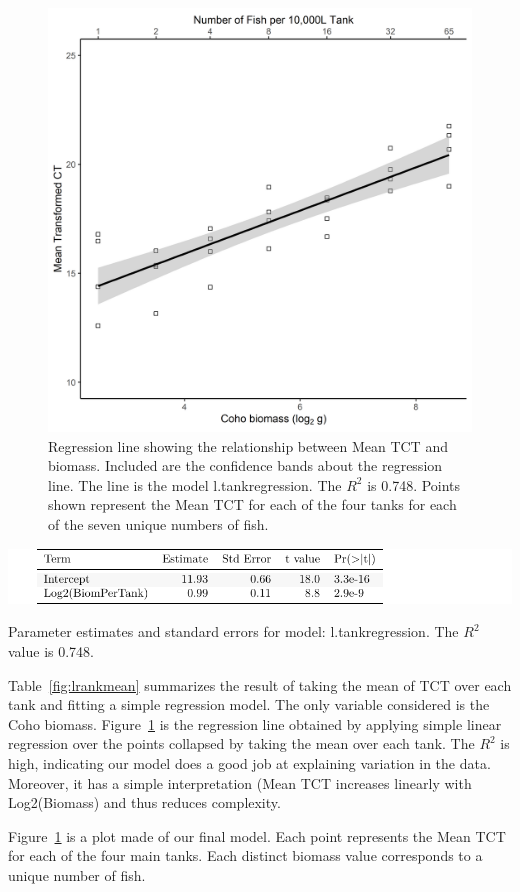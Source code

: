  
\begin{figure}[H]
\includegraphics{Chapter3Images/ggplotnew4.png}
\caption{  Regression line showing the relationship between Mean TCT and biomass. Included are the confidence bands about the regression line.  The line is the model l.tankregression. The $ R^{2}$ is 0.748. Points shown represent the Mean TCT for each of the four tanks for each of the seven unique numbers of fish.
}
\label{fig:medct55}
\end{figure}



\begin{table}[H]
\includegraphics{Chapter3Images/tankregressionMEAN.pdf}
\caption{Parameter estimates and standard errors for model: l.tankregression. The $R^{2}$ value is 0.748.}
\label{fig:lrankmean}
\end{table}

Table~\ref{fig:lrankmean} summarizes the result of taking the mean of TCT over each tank and fitting a simple regression model. The only variable considered is the Coho biomass. Figure~\ref{fig:medct55} is the regression line obtained by applying simple linear regression over the points collapsed by taking the mean over each tank. The $R^{2}$ is high, indicating our model does a good job at explaining variation in the data. Moreover, it has a simple interpretation (Mean TCT increases linearly with Log2(Biomass) and thus reduces complexity.




Figure~\ref{fig:medct55} is a plot made of our final model. Each point represents the Mean TCT for each of the four main tanks. Each distinct biomass value corresponds to a unique number of fish. 


